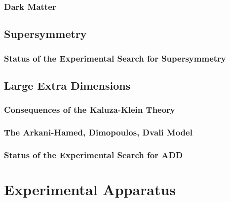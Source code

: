 \documentclass[10pt,twoside,cucitura,classica,openany]{toptesi}
\begin{document}


\subsection{Dark Matter}
\label{sec:dark-matter}



\section{Supersymmetry}
\label{sec:supersymmetry}



\subsection{Status of the Experimental Search for Supersymmetry}
\label{sec:susy-exper-search}



\section{Large Extra Dimensions}
\label{sec:large-extra-dimens}



\subsection{Consequences of the Kaluza-Klein Theory}
\label{sec:cons-kaluza-klein}



\subsection{The Arkani-Hamed, Dimopoulos, Dvali Model}
\label{sec:arkani-hamed-dimop}



\subsection{Status of the Experimental Search for ADD}
\label{sec:add-exper-search}



\chapter{Experimental Apparatus}
\label{cha:exper-appar}
\end{document}

